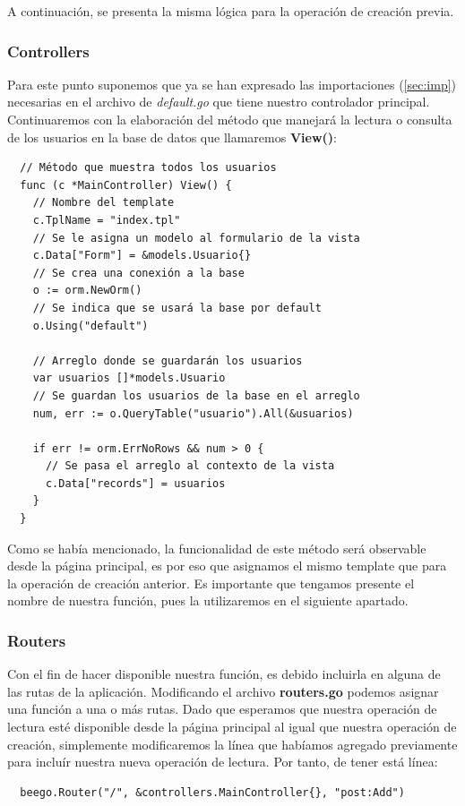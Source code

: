 \documentclass[12pt]{article}
\begin{document}
A continuación, se presenta la misma lógica para la operación
de creación previa.
\subsubsection{Controllers}
Para este punto suponemos que ya se han expresado las importaciones (\ref{sec:imp})
necesarias en el archivo de \textit{default.go} que tiene nuestro controlador
principal. Continuaremos con la elaboración del método que manejará la lectura
o consulta de los usuarios en la base de datos que llamaremos \textbf{View()}:

\begin{verbatim}
  // Método que muestra todos los usuarios
  func (c *MainController) View() {
    // Nombre del template
    c.TplName = "index.tpl"
    // Se le asigna un modelo al formulario de la vista
    c.Data["Form"] = &models.Usuario{}
    // Se crea una conexión a la base
    o := orm.NewOrm()
    // Se indica que se usará la base por default
    o.Using("default")

    // Arreglo donde se guardarán los usuarios
    var usuarios []*models.Usuario
    // Se guardan los usuarios de la base en el arreglo
    num, err := o.QueryTable("usuario").All(&usuarios)

    if err != orm.ErrNoRows && num > 0 {
      // Se pasa el arreglo al contexto de la vista
      c.Data["records"] = usuarios
    }
  }
\end{verbatim}
Como se había mencionado, la funcionalidad de este método será observable desde la página
principal, es por eso que asignamos el mismo template que para la operación de creación
anterior. Es importante que tengamos presente el nombre de nuestra función, pues la
utilizaremos en el siguiente apartado. 
\subsubsection{Routers}
Con el fin de hacer disponible nuestra función, es debido incluirla en alguna de las
rutas de la aplicación. Modificando el archivo \textbf{routers.go} podemos asignar una
función a una o más rutas. Dado que esperamos que nuestra operación de lectura esté disponible
desde la página principal al igual que nuestra operación de creación, simplemente modificaremos
la línea que habíamos agregado previamente para incluír nuestra nueva operación de lectura.
Por tanto, de tener está línea:
\begin{verbatim}
  beego.Router("/", &controllers.MainController{}, "post:Add")
\end{verbatim}
\end{document}
